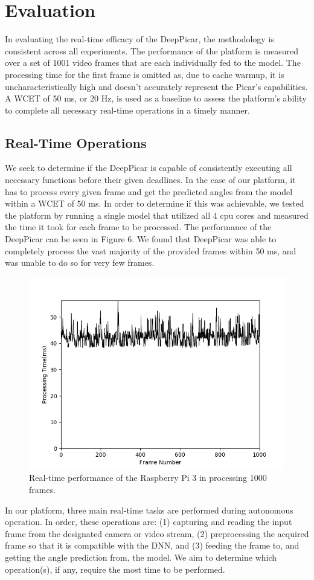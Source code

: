 
\section{Evaluation}\label{sec:evaluation}

In evaluating the real-time efficacy of the DeepPicar, the methodology is consistent across all 
experiments. The performance of the platform is measured over a set of 1001 video frames that are 
each individually fed to the model. The processing time for the first frame is omitted as, due to 
cache warmup, it is uncharacteristically high and doesn't accurately represent the Picar's capabilities. 
A WCET of 50 ms, or 20 Hz, is used as a baseline to assess the platform's ability to complete all 
necessary real-time operations in a timely manner.

\subsection{Real-Time Operations}
We seek to determine if the DeepPicar is capable of consistently executing all necessary functions 
before their given deadlines. In the case of our platform, it has to process every given frame and get 
the predicted angles from the model within a WCET of 50 ms. In order to determine if this was achievable, 
we tested the platform by running a single model that utilized all 4 cpu cores and measured the time it 
took for each frame to be processed. The performance of the DeepPicar can be seen in Figure 6. We found 
that DeepPicar was able to completely process the vast majority of the provided frames within 50 ms, and 
was unable to do so for very few frames.

\begin{figure}[h]
  \centering
  \includegraphics[width=.5\textwidth]{Total_Processing_Time}
  \caption{ Real-time performance of the Raspberry Pi 3 in processing 1000 frames.}
\end{figure}

In our platform, three main real-time tasks are performed during autonomous operation. In order, these 
operations are: (1) capturing and reading the input frame from the designated camera or video stream, 
(2) preprocessing the acquired frame so that it is compatible with the DNN, and (3) feeding the frame 
to, and getting the angle prediction from, the model. We aim to determine which operation(s), if any, 
require the most time to be performed.

